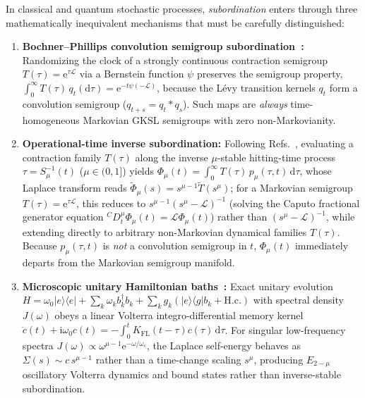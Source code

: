 \documentclass[twocolumn,10pt,amsmath,amssymb,floatfix]{revtex4-2}
\theoremstyle{plain}
\theoremstyle{definition}
\newcommand{\dd}{\mathrm{d}}
\newcommand{\ii}{\mathrm{i}}
\newcommand{\ee}{\mathrm{e}}
\begin{document}
In classical and quantum stochastic processes, \emph{subordination} enters through three mathematically inequivalent mechanisms that must be carefully distinguished:
\begin{enumerate}[leftmargin=1.4em,itemsep=2pt]
\item \textbf{Bochner--Phillips convolution semigroup subordination~\cite{Bochner1949PNAS,Bochner1955Book,Phillips1952PJM}:} Randomizing the clock of a strongly continuous contraction semigroup $T(\tau)=\ee^{\tau\mathcal{L}}$ via a Bernstein function $\psi$ preserves the semigroup property, $\int_0^\infty T(\tau)\,q_t(\dd\tau) = \ee^{-t\psi(-\mathcal{L})}$, because the L\'evy transition kernels $q_t$ form a convolution semigroup ($q_{t+s} = q_t * q_s$). Such maps are \emph{always} time-homogeneous Markovian GKSL semigroups with zero non-Markovianity.
\item \textbf{Operational-time inverse subordination:} Following Refs.~\cite{Sokolov2001PRE,Sokolov2002PRE,Meerschaert2004JAP,Budini2004PRA,Breuer2008PRL,Breuer2009PRE,Vacchini2013PRA}, evaluating a contraction family $T(\tau)$ along the inverse $\mu$-stable hitting-time process $\tau = S_\mu^{-1}(t)$ ($\mu \in (0,1]$) yields $\Phi_\mu(t) = \int_0^\infty T(\tau)\,p_\mu(\tau,t)\,\dd\tau$, whose Laplace transform reads $\tilde{\Phi}_\mu(s) = s^{\mu-1}\tilde{T}(s^\mu)$; for a Markovian semigroup $T(\tau) = \ee^{\tau\mathcal{L}}$, this reduces to $s^{\mu-1}(s^\mu - \mathcal{L})^{-1}$ (solving the Caputo fractional generator equation ${}^C D_t^\mu \Phi_\mu(t) = \mathcal{L}\Phi_\mu(t)$) rather than $(s^\mu - \mathcal{L})^{-1}$, while extending directly to arbitrary non-Markovian dynamical families $T(\tau)$. Because $p_\mu(\tau,t)$ is \emph{not} a convolution semigroup in $t$, $\Phi_\mu(t)$ immediately departs from the Markovian semigroup manifold.
\item \textbf{Microscopic unitary Hamiltonian baths~\cite{Friedrichs1948CPAM,Lee1954PR,Garraway1997PRA}:} Exact unitary evolution $H = \omega_0|e\rangle\langle e| + \sum_k \omega_k b_k^\dagger b_k + \sum_k g_k(|e\rangle\langle g|b_k + \mathrm{H.c.})$ with spectral density $J(\omega)$ obeys a linear Volterra integro-differential memory kernel $\dot{c}(t) + \ii\omega_0 c(t) = -\int_0^t K_{\mathrm{FL}}(t-\tau)c(\tau)\,\dd\tau$. For singular low-frequency spectra $J(\omega)\propto\omega^{\mu-1}\ee^{-\omega/\omega_c}$, the Laplace self-energy behaves as $\Sigma(s)\sim c\,s^{\mu-1}$ rather than a time-change scaling $s^\mu$, producing $E_{2-\mu}$ oscillatory Volterra dynamics and bound states rather than inverse-stable subordination.
\end{enumerate}
\end{document}
